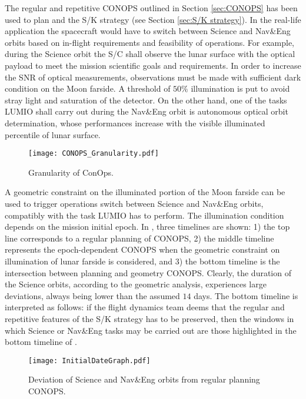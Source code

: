 The regular and repetitive {CONOPS} outlined in Section \ref{sec:CONOPS} has been used to plan and the S/K strategy (see Section \ref{sec:S/K strategy}). In the real-life application the spacecraft would have to switch between Science and Nav\&Eng orbits based on in-flight requirements and feasibility of operations. For example, during the Science orbit the {S/C} shall observe the lunar surface with the optical payload to meet the mission scientific goals and requirements. In order to increase the {SNR} of optical measurements, observations must be made with sufficient dark condition on the Moon farside. A threshold of $50\%$ illumination is put to avoid stray light and saturation of the detector. On the other hand, one of the tasks LUMIO shall carry out during the Nav\&Eng orbit is autonomous optical orbit determination, whose performances increase with the visible illuminated percentile of lunar surface.
%
\begin{figure}[t!]
	\centering
	\texttt{[image: CONOPS\_Granularity.pdf]}
	\caption{Granularity of ConOps.}
	\label{fig:CONOPS_Granularity}
\end{figure}
%

A geometric constraint on the illuminated portion of the Moon farside can be used to trigger operations switch between Science and Nav\&Eng orbits, compatibly with the task LUMIO has to perform. The illumination condition depends on the mission initial epoch. In , three timelines are shown: 1) the top line corresponds to a regular planning of {CONOPS}, 2) the middle timeline represents the epoch-dependent {CONOPS} when the geometric constraint on illumination of lunar farside is considered, and 3) the bottom timeline is the intersection between planning and geometry {CONOPS}. Clearly, the duration of the Science orbits, according to the geometric analysis, experiences large deviations, always being lower than the assumed $14$ days. The bottom timeline is interpreted as follows: if the flight dynamics team deems that the regular and repetitive features of the S/K strategy has to be preserved, then the windows in which Science or Nav\&Eng tasks may be carried out are those highlighted in the bottom timeline of .
%
\begin{figure}[t!]
	\centering
	\texttt{[image: InitialDateGraph.pdf]}
	\caption[Deviations from regular ConOps planning.]{Deviation of Science and Nav\&Eng orbits from regular planning {CONOPS}.}
	\label{fig:InitialDateGraph}
\end{figure}
%

